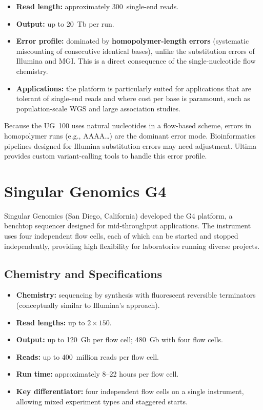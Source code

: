 \begin{itemize}[nosep]
  \item \textbf{Read length:} approximately 300\basepair\ single-end reads.
  \item \textbf{Output:} up to 20~Tb per run.
  \item \textbf{Error profile:} dominated by \textbf{homopolymer-length errors} (systematic miscounting of consecutive identical bases), unlike the substitution errors of Illumina and MGI. This is a direct consequence of the single-nucleotide flow chemistry.
  \item \textbf{Applications:} the platform is particularly suited for applications that are tolerant of single-end reads and where cost per base is paramount, such as population-scale \gls{WGS} and large association studies.
\end{itemize}

\begin{warningbox}[title={Homopolymer Errors on Ultima}]
Because the UG~100 uses natural nucleotides in a flow-based scheme, errors in homopolymer runs (e.g., AAAA\ldots) are the dominant error mode. Bioinformatics pipelines designed for Illumina substitution errors may need adjustment. Ultima provides custom variant-calling tools to handle this error profile.
\end{warningbox}


\section{Singular Genomics G4}
\label{sec:singular}

Singular Genomics (San Diego, California) developed the G4 platform, a benchtop sequencer designed for mid-throughput applications. The instrument uses four independent flow cells, each of which can be started and stopped independently, providing high flexibility for laboratories running diverse projects.

\subsection{Chemistry and Specifications}

\begin{itemize}[nosep]
  \item \textbf{Chemistry:} sequencing by synthesis with fluorescent reversible terminators (conceptually similar to Illumina's approach).
  \item \textbf{Read lengths:} up to $2 \times 150$\basepair.
  \item \textbf{Output:} up to 120~Gb per flow cell; 480~Gb with four flow cells.
  \item \textbf{Reads:} up to 400~million reads per flow cell.
  \item \textbf{Run time:} approximately 8--22 hours per flow cell.
  \item \textbf{Key differentiator:} four independent flow cells on a single instrument, allowing mixed experiment types and staggered starts.
\end{itemize}

